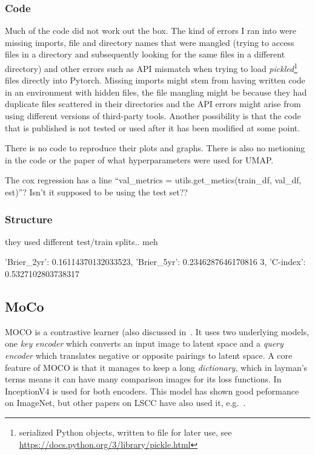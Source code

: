 \documentclass[10pt,twocolumn,letterpaper]{article}
\begin{document}
\subsubsection{Code}\label{subsubsec:code}
Much of the code did not work out the box. The kind of errors I ran into were missing imports, file and directory names that were mangled (trying to access files in a directory and subsequently looking for the same files in a different directory) and other errors such as API mismatch when trying to load \textit{pickled}\footnote{serialized Python objects, written to file for later use, see \href{https://docs.python.org/3/library/pickle.html}{https://docs.python.org/3/library/pickle.html}} files directly into Pytorch. Missing imports might stem from having written code in an environment with hidden files, the file mangling might be because they had duplicate files scattered in their directories and the API errors might arise from using different versions of third-party tools. Another possibility is that the code that is published is not tested or used after it has been modified at some point. 

There is no code to reproduce their plots and graphs. There is also no metioning in the code or the paper of what hyperparameters were used for \gls{UMAP}. 

The cox regression has a line ``val_metrics = utils.get\_metics(train\_df, val\_df, est)''? Isn't it supposed to be using the test set??


\subsubsection{Structure}\label{subsubsec:misconception}
they used different test/train splits.. meh

{'Brier_2yr': 0.16114370132033523, 'Brier_5yr': 0.2346287646170816
3, 'C-index': 0.5327102803738317}

\subsection{MoCo}\label{subsec:moco}
\gls{MOCO}\cite{moco} is a contrastive learner (also discussed in~. It uses two underlying models, one \textit{key encoder} which converts an input image to latent space and a \textit{query encoder} which translates negative or opposite pairings to latent space. A core feature of \gls{MOCO} is that it manages to keep a long \textit{dictionary}, which in layman's terms means it can have many comparison images for its loss functions. In~\cite{sslUMAP} InceptionV4\cite{inceptionV4} is used for both encoders. This model has shown good peformance on ImageNet, but other papers on \gls{LSCC} have also used it, e.g.~\cite{otherInception}.
\end{document}
